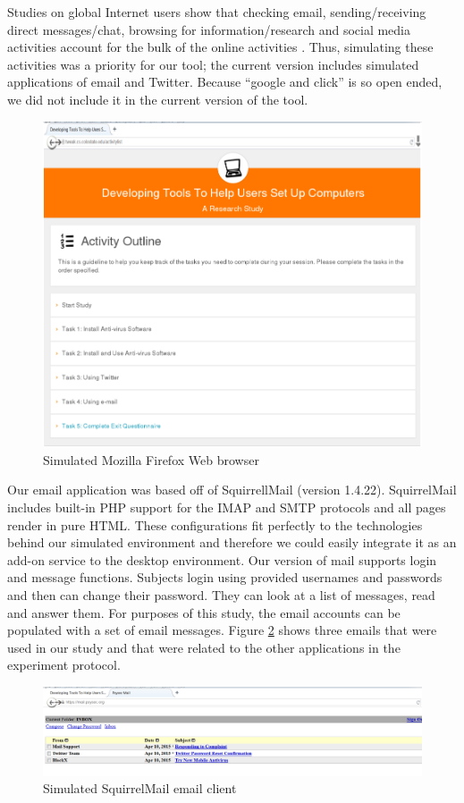 Studies on global Internet users show that checking email, sending/receiving direct messages/chat, browsing for information/research and social media activities account for the bulk of the online activities \cite{furnell2007, worldinternet2018}. Thus, simulating these activities was a priority for our tool; the current version includes simulated applications of email and Twitter. Because ``google and click'' is so open ended, we did not include it in the current version of the tool.

\begin{figure}[!ht]
  \centering
\includegraphics[width=\columnwidth, keepaspectratio=true]{img/browser.png}
  \caption{Simulated Mozilla Firefox Web browser}
  \label{fig:browser}
\end{figure}

Our email application was based off of SquirrellMail (version 1.4.22). SquirrelMail includes built-in PHP support for the IMAP and SMTP protocols and all pages render in pure HTML. These configurations fit perfectly to the technologies behind our simulated environment and therefore we could easily integrate it as an add-on service to the desktop environment. Our version of mail supports login and message functions. Subjects login using provided usernames and passwords and then can change their password. They can look at a list of messages, read and answer them. For purposes of this study, the email accounts can be populated with a set of email messages. Figure \ref{fig:mail} shows three emails that were used in our study and that were related to the other applications in the experiment protocol.
\begin{figure}[!ht]
  \centering
\includegraphics[width=\columnwidth, keepaspectratio=true]{img/mail.png}
  \caption{Simulated SquirrelMail email client}
  \label{fig:mail}
\end{figure}

